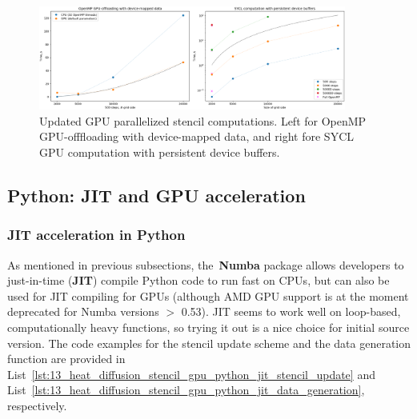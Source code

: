 \begin{figure}[htbp]
\centering\includegraphics[width=0.9\textwidth]{fig_problem/heat_openmp_sycl_update.png}
\caption{Updated GPU parallelized stencil computations. Left for OpenMP GPU-offfloading with device-mapped data, and right fore SYCL GPU computation with persistent device buffers.}\label{fig:heat_openmp_sycl_update}
\end{figure}




\subsection{Python: JIT and GPU acceleration}


\subsubsection{JIT acceleration in Python}


\par
As mentioned in previous subsections, the~\textbf{Numba} package allows developers to just-in-time (\textbf{JIT}) compile Python code to run fast on CPUs, but can also be used for JIT compiling for GPUs (although AMD GPU support is at the moment deprecated for Numba versions $>$ 0.53).
JIT seems to work well on loop-based, computationally heavy functions, so trying it out is a nice choice for initial source version.
The code examples for the stencil update scheme and the data generation function are provided in List~\ref{lst:13_heat_diffusion_stencil_gpu_python_jit_stencil_update} and List~\ref{lst:13_heat_diffusion_stencil_gpu_python_jit_data_generation}, respectively.





